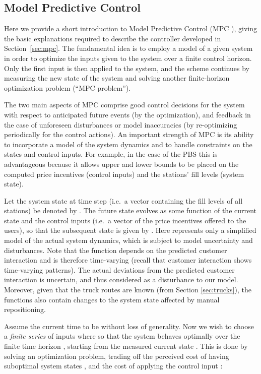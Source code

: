 \documentclass{article}
\begin{document}
\subsection{Model Predictive Control}\label{sec:model-pred-contr}
Here we provide a short introduction to Model Predictive Control (MPC \cite{maciejowski2002}), giving
the basic explanations required to describe the controller developed
in Section~\ref{sec:mpc}. The fundamental idea is to employ a model of a given system in
order to optimize the inputs given to the system over a finite control horizon.
Only the first input is then applied to the system, and the scheme continues by
measuring the new state of the system and solving another finite-horizon
optimization problem (``MPC problem'').

The two main aspects of MPC comprise good control decisions for the system with
respect to anticipated future events (by the optimization), and feedback in the
case of unforeseen disturbances or model inaccuracies (by re-optimizing
periodically for the control actions). An important strength of MPC is its
ability to incorporate a model of the system dynamics and to handle constraints
on the states and control inputs. For example, in the case of the PBS this is
advantageous because it allows upper and lower bounds to be placed on the computed
price incentives (control inputs) and the stations' fill levels (system state).

Let the system state at time step  (i.e.\ a vector containing the fill levels
of all stations) be denoted by . The future state evolves as some function
of the current state and the control inputs  (i.e.\ a vector of the price
incentives offered to the users), so that the subsequent state is given by
. Here  represents only a simplified model of the
actual system dynamics, which is subject to model uncertainty and disturbances.
Note that the function  depends on the predicted customer interaction and
is therefore time-varying (recall that customer interaction shows time-varying
patterns). The actual deviations from the predicted customer interaction is
uncertain, and thus considered as a disturbance to our model. Moreover, given
that the truck routes are known (from Section \ref{sec:trucks}), the functions
 also contain changes to the system state affected by manual repositioning.

Assume the current time to be  without loss of generality. Now we wish to
choose a \emph{finite series} of inputs  where  so that
the system behaves optimally over the finite time horizon , starting from the
measured current state . This is done by solving an optimization problem,
trading off the perceived cost of having suboptimal system states , and
the cost of applying the control input :
\end{document}
